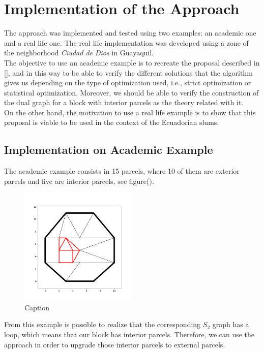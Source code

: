 \documentclass[10pt]{article}
\begin{document}
\section{Implementation of the Approach}
The approach was implemented and tested using two examples: an academic one and a real life one. The real life implementation was developed using a zone of the neighborhood \emph{Ciudad de Dios} in Guayaquil.\\

The objective to use an academic example is to recreate the proposal described in [], and in this way to be able to verify the different solutions that the algorithm gives us depending on the type of optimization used, i.e., strict optimization or statistical optimization. Moreover, we should be able to verify the construction of the dual graph for a block with interior parcels as the theory related with it.\\

On the other hand, the motivation to use a real life example is to show that this proposal is viable to be used in the context of the Ecuadorian slums.

\subsection{Implementation on Academic Example}
The academic example consists in 15 parcels, where 10 of them are exterior parcels and five are interior parcels, see figure().\\

\begin{figure}[H]
    \centering
    \includegraphics[width=0.50\textwidth]{images/Figure_1.png}
    \caption{Caption}
    \label{fig:my_label}
\end{figure}

From this example is possible to realize that the corresponding $S_2$ graph has a loop, which means that our block has interior parcels. Therefore, we can use the approach in order to upgrade those interior parcels to external parcels.\\
\end{document}
